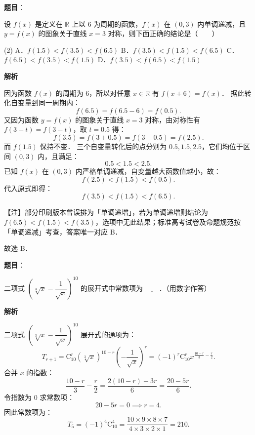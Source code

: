 \begin{answer}

\textbf{题目}：

设 $f(x)$ 是定义在 $\mathbb{R}$ 上以 $6$ 为周期的函数，$f(x)$ 在 $(0, 3)$ 内单调递减，且 $y = f(x)$ 的图象关于直线 $x = 3$ 对称，则下面正确的结论是\mbox{（　　）}

\begin{gkopts}(2)
\task A．$f(1.5) < f(3.5) < f(6.5)$
\task B．$f(3.5) < f(1.5) < f(6.5)$
\task C．$f(6.5) < f(3.5) < f(1.5)$
\task D．$f(3.5) < f(6.5) < f(1.5)$
\end{gkopts}

\textbf{解析}

因为函数 $f(x)$ 的周期为 $6$，所以对任意 $x \in \mathbb{R}$ 有 $f(x + 6) = f(x)$．
据此转化自变量到同一周期内：
\nopagebreak[4]
\[
f(6.5) = f(6.5 - 6) = f(0.5).
\]
又因为函数 $y = f(x)$ 的图象关于直线 $x = 3$ 对称，由对称性有 $f(3 + t) = f(3 - t)$，取 $t = 0.5$ 得：
\nopagebreak[4]
\[
f(3.5) = f(3 + 0.5) = f(3 - 0.5) = f(2.5).
\]
而 $f(1.5)$ 保持不变．
三个自变量转化后的点分别为 $0.5, 1.5, 2.5$，它们均位于区间 $(0, 3)$ 内，且满足：
\nopagebreak[4]
\[
0.5 < 1.5 < 2.5.
\]
已知 $f(x)$ 在 $(0, 3)$ 内严格单调递减，自变量越大函数值越小，故：
\nopagebreak[4]
\[
f(2.5) < f(1.5) < f(0.5).
\]
代入原式即得：
\nopagebreak[4]
\[
f(3.5) < f(1.5) < f(6.5).
\]

【注】部分印刷版本曾误排为「单调递增」，若为单调递增则结论为 $f(6.5) < f(1.5) < f(3.5)$，选项中无此结果；标准高考试卷及命题规范按「单调递减」考查，答案唯一对应 B．

故选 B．


\end{answer}
\begin{answer}

\textbf{题目}：

二项式 $\left(\sqrt[3]{x} - \dfrac{1}{\sqrt{x}}\right)^{10}$ 的展开式中常数项为 $\underline{\hspace{2em}}$．（用数字作答）

\textbf{解析}

二项式 $\left(\sqrt[3]{x} - \dfrac{1}{\sqrt{x}}\right)^{10}$ 展开式的通项为：
\nopagebreak[4]
\[
T_{r+1} = \mathrm{C}_{10}^r (\sqrt[3]{x})^{10-r} \left(-\dfrac{1}{\sqrt{x}}\right)^r = (-1)^r \mathrm{C}_{10}^r x^{\frac{10-r}{3} - \frac{r}{2}}.
\]
合并 $x$ 的指数：
\nopagebreak[4]
\[
\dfrac{10-r}{3} - \dfrac{r}{2} = \dfrac{2(10-r) - 3r}{6} = \dfrac{20 - 5r}{6}.
\]
令指数为 $0$ 求常数项：
\nopagebreak[4]
\[
20 - 5r = 0 \implies r = 4.
\]
因此常数项为：
\nopagebreak[4]
\[
T_5 = (-1)^4 \mathrm{C}_{10}^4 = \dfrac{10 \times 9 \times 8 \times 7}{4 \times 3 \times 2 \times 1} = 210.
\]


\end{answer}
